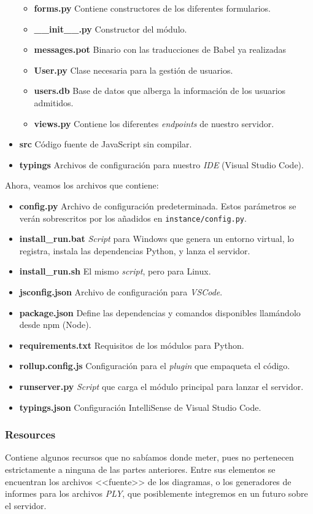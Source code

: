 \begin{itemize}
\begin{itemize}
			\item \textbf{forms.py} Contiene constructores de los diferentes formularios.
			\item \textbf{\_\_init\_\_.py} Constructor del módulo.
			\item \textbf{messages.pot} Binario con las traducciones de Babel ya realizadas
			\item \textbf{User.py} Clase necesaria para la gestión de usuarios.
			\item \textbf{users.db} Base de datos que alberga la información de los usuarios admitidos.
			\item \textbf{views.py} Contiene los diferentes \textit{endpoints} de nuestro servidor.
		\end{itemize}
	\item \textbf{src} Código fuente de JavaScript sin compilar.
	\item \textbf{typings} Archivos de configuración para nuestro \textit{IDE} (Visual Studio Code).
\end{itemize}

Ahora, veamos los archivos que contiene:
\begin{itemize}
	\item \textbf{config.py} Archivo de configuración predeterminada. Estos parámetros se verán sobrescritos por los añadidos en \texttt{instance/config.py}.
	\item \textbf{install\_run.bat} \textit{Script} para Windows que genera un entorno virtual, lo registra, instala las dependencias Python, y lanza el servidor.
	\item \textbf{install\_run.sh} El mismo \textit{script}, pero para Linux.
	\item \textbf{jsconfig.json} Archivo de configuración para \textit{VSCode}.
	\item \textbf{package.json} Define las dependencias y comandos disponibles llamándolo desde npm (Node).
	\item \textbf{requirements.txt} Requisitos de los módulos para Python.
	\item \textbf{rollup.config.js} Configuración para el \textit{plugin} que empaqueta el código.
	\item \textbf{runserver.py} \textit{Script} que carga el módulo principal para lanzar el servidor.
	\item \textbf{typings.json} Configuración IntelliSense de Visual Studio Code.
\end{itemize}

\subsubsection{Resources}
Contiene algunos recursos que no sabíamos donde meter, pues no pertenecen estrictamente a ninguna de las partes anteriores. Entre sus elementos se encuentran los archivos <<fuente>> de los diagramas, o los generadores de informes para los archivos \textit{PLY}, que posiblemente integremos en un futuro sobre el servidor.

